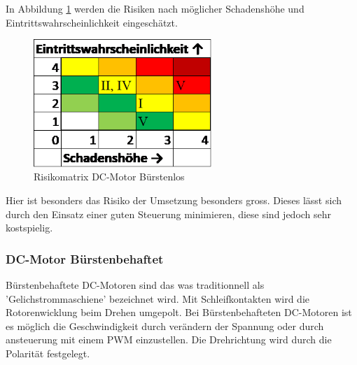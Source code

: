 \documentclass[../../main.tex]{subfiles}
\begin{document}
    In Abbildung \ref{fig:antr_risikomatrix_buerstenlos} werden die Risiken nach möglicher Schadenshöhe und Eintrittswahrscheinlichkeit eingeschätzt.

    \begin{figure}[H]
        \centering
        \includegraphics[width=0.6\textwidth]{Antr_Risiko_DCMotor_Buerstenlos.png}
        \caption {Risikomatrix DC-Motor Bürstenlos}
        \label{fig:antr_risikomatrix_buerstenlos}
    \end{figure}

    Hier ist besonders das Risiko der Umsetzung besonders gross. Dieses lässt sich durch den Einsatz einer guten Steuerung minimieren, diese sind jedoch sehr kostspielig.

    \subsubsection{DC-Motor Bürstenbehaftet}
    
    Bürstenbehaftete DC-Motoren sind das was traditionnell als 'Gelichstrommaschiene' bezeichnet wird. Mit Schleifkontakten wird die Rotorenwicklung beim Drehen umgepolt.
    Bei Bürstenbehafteten DC-Motoren ist es möglich die Geschwindigkeit durch verändern der Spannung oder durch ansteuerung mit einem PWM einzustellen. Die Drehrichtung wird durch die Polarität festgelegt.
\end{document}
